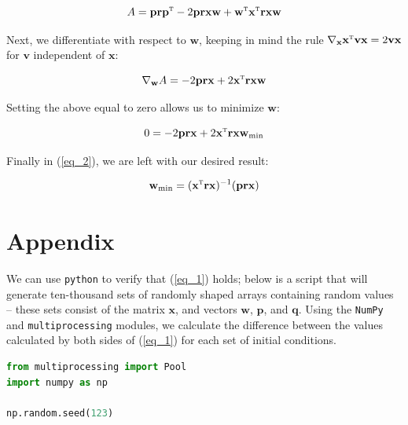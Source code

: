 \documentclass[a4paper,10pt,english]{article}
\begin{document}
\begin{multicols*}{2}
\begin{equation*}
A = \mathbf{p} \mathbf{r} \mathbf{p}^\textsc{t} - 2 \mathbf{p} \mathbf{r} \mathbf{x} \mathbf{w} + \mathbf{w}^\textsc{t} \mathbf{x}^\textsc{t} \mathbf{r} \mathbf{x} \mathbf{w}
\end{equation*}

Next, we differentiate with respect to $\mathbf{w}$, keeping in mind the rule $\nabla_\mathbf{x} \mathbf{x}^\textsc{t} \mathbf{v} \mathbf{x} = 2 \mathbf{v} \mathbf{x}$ for $\mathbf{v}$ independent of $\mathbf{x}$:

\begin{equation*}
\nabla_\mathbf{w} A = - 2 \mathbf{p} \mathbf{r} \mathbf{x} + 2 \mathbf{x}^\textsc{t} \mathbf{r} \mathbf{x} \mathbf{w}
\end{equation*}

Setting the above equal to zero allows us to minimize $\mathbf{w}$:

\begin{equation*}
0 = - 2 \mathbf{p} \mathbf{r} \mathbf{x} + 2 \mathbf{x}^\textsc{t} \mathbf{r} \mathbf{x} \mathbf{w}_\text{min}
\end{equation*}

Finally in (\ref{eq_2}), we are left with our desired result:

\begin{equation}
\label{eq_2}
\mathbf{w}_\text{min} = ( \mathbf{x}^\textsc{t} \mathbf{r} \mathbf{x} )^{-1} ( \mathbf{p} \mathbf{r} \mathbf{x} )
\end{equation}

\section*{Appendix}

We can use \texttt{python} to verify that (\ref{eq_1}) holds; below is a script that will generate ten-thousand sets of randomly shaped arrays containing random values – these sets consist of the matrix $\mathbf{x}$, and vectors $\mathbf{w}$, $\mathbf{p}$, and $\mathbf{q}$.  Using the \texttt{NumPy} and \texttt{multiprocessing} modules, we calculate the difference between the values calculated by both sides of (\ref{eq_1}) for each set of initial conditions.

\begin{lstlisting}[showstringspaces=false,language=Python,numbers=none]
from multiprocessing import Pool
import numpy as np

np.random.seed(123)


\end{lstlisting}
\end{multicols*}
\end{document}
